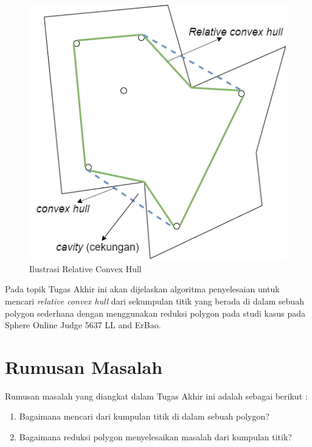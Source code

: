 \begin{figure}[!h]
	\Centering
	\includegraphics [width=0.5\columnwidth]{bab2/img/ilustrasi-relative-convex-hull}
	\caption {Ilustrasi Relative Convex Hull}
	\label {fig:ilustrasi-relative-convex-hull}
\end{figure}

\par Pada topik Tugas Akhir ini akan dijelaskan algoritma penyelesaian untuk mencari \textit{relative convex hull} dari sekumpulan titik yang berada di dalam sebuah polygon sederhana dengan menggunakan reduksi polygon pada studi kasus pada Sphere Online Judge 5637 LL and ErBao.

\section {Rumusan Masalah}

Rumusan masalah yang diangkat dalam Tugas Akhir ini adalah sebagai berikut :

\begin {enumerate}
    \item Bagaimana mencari \RCH dari kumpulan titik di dalam sebuah polygon?
    \item Bagaimana reduksi polygon menyelesaikan masalah \RCH dari kumpulan titik?
\end {enumerate}

